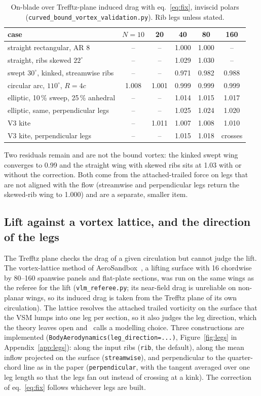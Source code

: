 \documentclass[11pt,a4paper]{article}
\begin{document}
\begin{table}[h]\centering\small
\caption{On-blade over Trefftz-plane induced drag with eq.~\eqref{eq:fix}, inviscid polars (\texttt{curved\_bound\_vortex\_validation.py}). Rib legs unless stated.}
\label{tab:fix}
\begin{tabular}{lccccc}
\toprule
case & $N=10$ & 20 & 40 & 80 & 160\\
\midrule
straight rectangular, AR 8 & -- & -- & 1.000 & 1.000 & --\\
straight, ribs skewed $22^\circ$ & -- & -- & 1.029 & 1.030 & --\\
swept $30^\circ$, kinked, streamwise ribs & -- & -- & 0.971 & 0.982 & 0.988\\
circular arc, $110^\circ$, $R=4c$ & 1.008 & 1.001 & 0.999 & 0.999 & 0.999\\
elliptic, 10\,\% sweep, 25\,\% anhedral & -- & -- & 1.014 & 1.015 & 1.017\\
elliptic, same, perpendicular legs & -- & -- & 1.025 & 1.024 & 1.020\\
V3 kite & -- & 1.011 & 1.007 & 1.008 & 1.010\\
V3 kite, perpendicular legs & -- & -- & 1.015 & 1.018 & crosses\\
\bottomrule
\end{tabular}
\end{table}

Two residuals remain and are not the bound vortex: the kinked swept wing converges to 0.99 and the straight wing with skewed ribs sits at 1.03 with or without the correction. Both come from the attached-trailed force on legs that are not aligned with the flow (streamwise and perpendicular legs return the skewed-rib wing to 1.000) and are a separate, smaller item.

\subsection{Lift against a vortex lattice, and the direction of the legs}
\label{sec:legs}
The Trefftz plane checks the drag of a given circulation but cannot judge the lift. The vortex-lattice method of AeroSandbox~\cite{aerosandbox}, a lifting surface with 16 chordwise by 80--160 spanwise panels and flat-plate sections, was run on the same wings as the referee for the lift (\texttt{vlm\_referee.py}; its near-field drag is unreliable on non-planar wings, so its induced drag is taken from the Trefftz plane of its own circulation). The lattice resolves the attached trailed vorticity on the surface that the VSM lumps into one leg per section, so it also judges the leg direction, which the theory leaves open and~\cite{gaunaa2026} calls a modelling choice. Three constructions are implemented (\texttt{BodyAerodynamics(leg\_direction=...)}, Figure~\ref{fig:legs} in Appendix~\ref{app:legs}): along the input ribs (\texttt{rib}, the default), along the mean inflow projected on the surface (\texttt{streamwise}), and perpendicular to the quarter-chord line as in the paper (\texttt{perpendicular}, with the tangent averaged over one leg length so that the legs fan out instead of crossing at a kink). The correction of eq.~\eqref{eq:fix} follows whichever legs are built.
\end{document}
